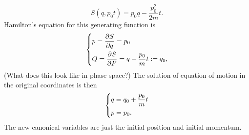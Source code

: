 \documentclass{article}
\begin{document}
        \begin{equation*}
            S(q, p_0 t) = p_0q - \frac{p_0^2}{2m} t.
        \end{equation*}
        Hamilton's equation for this generating function is 
        \begin{equation*}
            \begin{dcases}
                p = \pdv{S}{q} = p_0 \\
                Q = \pdv{S}{P} = q - \frac{p_0}{m}t := q_0,
            \end{dcases}
        \end{equation*}
        (What does this look like in phase space?) The solution of equation of motion in the original coordinates is then
        \begin{equation*}
        \begin{dcases*}
            q = q_0 + \frac{p_0}{m}t \\
            p = p_0.
        \end{dcases*}
        \end{equation*}
        The new canonical variables are just the initial position and initial momentum.

    
\end{document}
